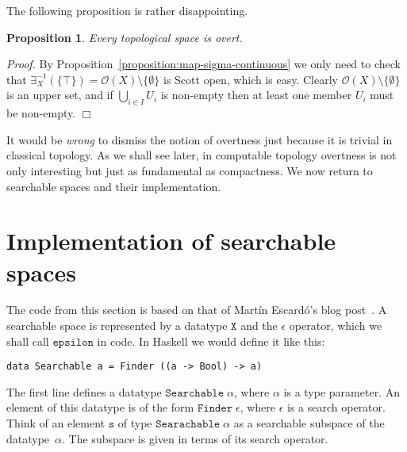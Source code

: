\documentclass[a4paper,10pt]{article}
\newtheorem{proposition}[theorem]{Proposition}
\newenvironment{proof}{\par\noindent\textit{Proof.}}{\hfill$\Box$\par\medskip}
\newcommand{\set}[1]{\{#1\}}
\newcommand{\tpl}[1]{\mathcal{O}(#1)}
\newcommand{\R}[1]{\mathtt{#1}}
\begin{document}
The following proposition is rather disappointing.

\begin{proposition} Every topological space is overt.
\end{proposition}

\begin{proof} By Proposition~\ref{proposition:map-sigma-continuous} we only
need to check that $\exists_X^{-1}(\set{\top}) = \tpl{X} \setminus
\set{\emptyset}$ is Scott open, which is easy. Clearly $\tpl{X} \setminus
\set{\emptyset}$ is an upper set, and if $\bigcup_{i \in I} U_i$ is non-empty
then at least one member $U_i$ must be non-empty.
\end{proof}

It would be \emph{wrong} to dismiss the notion of overtness just because it is
trivial in classical topology. As we shall see later, in computable topology
overtness is not only interesting but just as fundamental as compactness. We
now return to searchable spaces and their implementation.

\section{Implementation of searchable spaces}
\label{sec:implementation-searchable}

The code from this section is based on that of Martín Escardó's blog
post~\cite{escardo08:blog}. A searchable space is represented by a datatype
$\mathtt{X}$ and the $\epsilon$ operator, which we shall call $\R{epsilon}$ in
code. In Haskell we would define it like this:
% 
\begin{lstlisting}
data Searchable a = Finder ((a -> Bool) -> a)
\end{lstlisting}
% 
The first line defines a datatype $\mathtt{Searchable}\;\alpha$, where
$\alpha$ is a type parameter. An element of this datatype is of the
form $\mathtt{Finder}\;\epsilon$, where $\epsilon$ is a search
operator. Think of an element $\R{s}$ of type
$\mathtt{Searachable}\;\alpha$ as a searchable subspace of the
datatype~$\alpha$. The subspace is given in terms of its search
operator.
\end{document}
